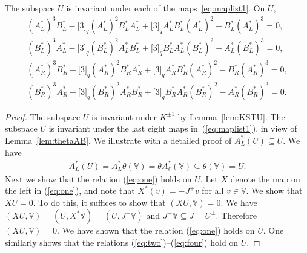 \begin{Proposition}\label{prop:Uinv}The subspace $U$ is invariant under each of the maps~\eqref{eq:maplist1}. On $U$,
\begin{gather}\label{eq:one}
(A^*_L)^3 B^*_L
-\lbrack 3 \rbrack_q (A^*_L)^2 B^*_L A^*_L
+\lbrack 3 \rbrack_q A^*_L B^*_L (A^*_L)^2
-B^*_L (A^*_L)^3 = 0,
\\
\label{eq:two}
(B^*_L)^3 A^*_L -\lbrack 3 \rbrack_q (B^*_L)^2 A^*_L B^*_L
+\lbrack 3 \rbrack_q B^*_L A^*_L (B^*_L)^2
-A^*_L (B^*_L)^3 = 0,
\\
\label{eq:three}(A^*_R)^3 B^*_R
-\lbrack 3 \rbrack_q (A^*_R)^2 B^*_R A^*_R
+\lbrack 3 \rbrack_q A^*_R B^*_R (A^*_R)^2
-B^*_R (A^*_R)^3 = 0,\\
\label{eq:four}
(B^*_R)^3 A^*_R
-\lbrack 3 \rbrack_q (B^*_R)^2 A^*_R B^*_R
+\lbrack 3 \rbrack_q B^*_R A^*_R (B^*_R)^2
-A^*_R (B^*_R)^3 = 0.
\end{gather}
\end{Proposition}
\begin{proof}The subspace $U$ is invariant under $K^{\pm 1}$ by Lemma~\ref{lem:KSTU}. The subspace $U$ is invariant under the last eight maps in~(\ref{eq:maplist1}), in view of Lemma~\ref{lem:thetaAB}.
We illustrate with a detailed proof of $A^*_L (U) \subseteq U$. We have
\begin{gather*}
A^*_L (U) = A^*_L \theta (\mathbb V) = \theta A^*_\ell (\mathbb V)
\subseteq \theta (\mathbb V) = U.
\end{gather*}
Next we show that the relation (\ref{eq:one}) holds on $U$.
Let $X$ denote the map on the left in (\ref{eq:one}), and note
that $X^*(v)=-J^+v$ for all $v \in \mathbb V$. We show that
$XU=0$. To do this, it suffices to show that $(XU,\mathbb V)=0$. We have
$(XU,\mathbb V) = (U,X^*\mathbb V)=(U, J^+\mathbb V)$
and $J^+\mathbb V \subseteq J = U^\perp$. Therefore
$(XU,\mathbb V)=0$.
We have shown that the relation (\ref{eq:one}) holds on $U$.
One similarly shows that the relations (\ref{eq:two})--(\ref{eq:four}) hold on $U$.
\end{proof}

